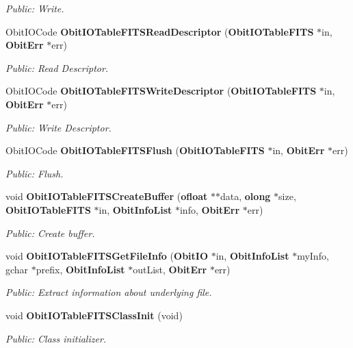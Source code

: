 \begin{CompactItemize}
\begin{CompactList}\small\item\em Public: Write. \item\end{CompactList}\item 
Obit\-IOCode {\bf Obit\-IOTable\-FITSRead\-Descriptor} ({\bf Obit\-IOTable\-FITS} $\ast$in, {\bf Obit\-Err} $\ast$err)
\begin{CompactList}\small\item\em Public: Read Descriptor. \item\end{CompactList}\item 
Obit\-IOCode {\bf Obit\-IOTable\-FITSWrite\-Descriptor} ({\bf Obit\-IOTable\-FITS} $\ast$in, {\bf Obit\-Err} $\ast$err)
\begin{CompactList}\small\item\em Public: Write Descriptor. \item\end{CompactList}\item 
Obit\-IOCode {\bf Obit\-IOTable\-FITSFlush} ({\bf Obit\-IOTable\-FITS} $\ast$in, {\bf Obit\-Err} $\ast$err)
\begin{CompactList}\small\item\em Public: Flush. \item\end{CompactList}\item 
void {\bf Obit\-IOTable\-FITSCreate\-Buffer} ({\bf ofloat} $\ast$$\ast$data, {\bf olong} $\ast$size, {\bf Obit\-IOTable\-FITS} $\ast$in, {\bf Obit\-Info\-List} $\ast$info, {\bf Obit\-Err} $\ast$err)
\begin{CompactList}\small\item\em Public: Create buffer. \item\end{CompactList}\item 
void {\bf Obit\-IOTable\-FITSGet\-File\-Info} ({\bf Obit\-IO} $\ast$in, {\bf Obit\-Info\-List} $\ast$my\-Info, gchar $\ast$prefix, {\bf Obit\-Info\-List} $\ast$out\-List, {\bf Obit\-Err} $\ast$err)
\begin{CompactList}\small\item\em Public: Extract information about underlying file. \item\end{CompactList}\item 
void {\bf Obit\-IOTable\-FITSClass\-Init} (void)
\begin{CompactList}\small\item\em Public: Class initializer. \item\end{CompactList}\end{CompactItemize}


